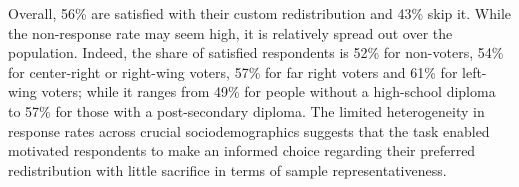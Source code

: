 \documentclass[12pt,english]{article}
\begin{document}
\begin{bibunit}
Overall, 56\% are satisfied with their custom redistribution and 43\% skip it. 
While the non-response rate may seem high, it is relatively spread out over the population. Indeed, the share of satisfied respondents is 52\% for non-voters, 54\% for center-right or right-wing voters, 57\% for far right voters and 61\% for left-wing voters; while it ranges from 49\% for people without a %
high-school diploma to 57\% for those with a post-secondary diploma.
The limited heterogeneity in response rates across crucial sociodemographics suggests that the task enabled motivated respondents to make an informed choice regarding their preferred redistribution with little sacrifice in terms of sample representativeness.



\end{bibunit}
\end{document}
